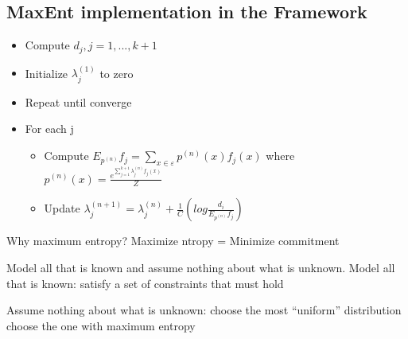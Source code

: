\subsection{MaxEnt implementation in the Framework}

\begin{itemize}
\item Compute $d_j, j=1,...,k+1$
\item Initialize $\lambda_j^{(1)}$ to zero
\item Repeat until converge
\item For each j 
  \begin{itemize}
  \item Compute $E_{p^{(n)}} f_j = \sum\limits_{x \in \varepsilon} p^{(n)} (x)f_j(x)$
    where $p^{(n)}(x) = \frac{e^{\sum\limits_{j=1}^{k+1}\lambda_j^{(n)}f_j(x)}}{Z}$ 
  \item Update $\lambda_j^{(n+1)} = \lambda_j^{(n)} + \frac{1}{C}(log\frac{d_i}{E_{{p^{(n)}}}f_j})$
  \end{itemize}
\end{itemize}

  




Why maximum entropy?
Maximize ntropy = Minimize commitment

Model all that is known and assume nothing about what is unknown. 
Model all that is known: satisfy a set of constraints that must hold

Assume nothing about what is unknown: 
   choose the most “uniform” distribution 
   choose the one with maximum entropy
